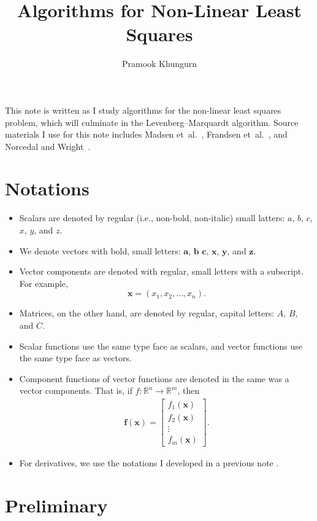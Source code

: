 \documentclass[10pt]{article}
\title{Algorithms for Non-Linear Least Squares}
\author{Pramook Khungurn}
\newcommand{\ve}[1]{\mathbf{#1}}
\newcommand{\etal}{{et~al.}}
\newcommand{\ra}{\rightarrow}
\newcommand{\Real}{\mathbb{R}}
\begin{document}
\maketitle

This note is written as I study algorithms for the non-linear least squares problem, which will culminate in the Levenberg--Marquardt algorithm. Source materials I use for this note includes Madsen \etal~\cite{Madsen:2004}, Frandsen \etal~\cite{Frandsen:2004}, and Norcedal and Wright~\cite{Norcedal:2006}.

\section{Notations}

\begin{itemize}
    \item Scalars are denoted by regular (i.e., non-bold, non-italic) small latters: $a$, $b$, $c$, $x$, $y$, and $z$.
    \item We denote vectors with bold, small letters: $\ve{a}$, $\ve{b}$ $\ve{c}$, $\ve{x}$, $\ve{y}$, and $\ve{z}$.
    \item Vector components are denoted with regular, small letters with a subscript. For example, $$\ve{x} = (x_1, x_2, \dots, x_n).$$
    \item Matrices, on the other hand, are denoted by regular, capital letters: $A$, $B$, and $C$.
    \item Scalar functions use the same type face as scalars, and vector functions use the same type face as vectors.
    \item Component functions of vector functions are denoted in the same was a vector components. That is, if $f: \Real^n \ra \Real^m$, then
    \begin{align*}
        \ve{f}(\ve{x}) = \begin{bmatrix} f_1(\ve{x}) \\ f_2(\ve{x}) \\ \vdots \\ f_m(\ve{x}) \end{bmatrix}.
    \end{align*}
    \item For derivatives, we use the notations I developed in a previous note \cite{Khungurn:2022}.
\end{itemize}

\section{Preliminary}
\end{document}
